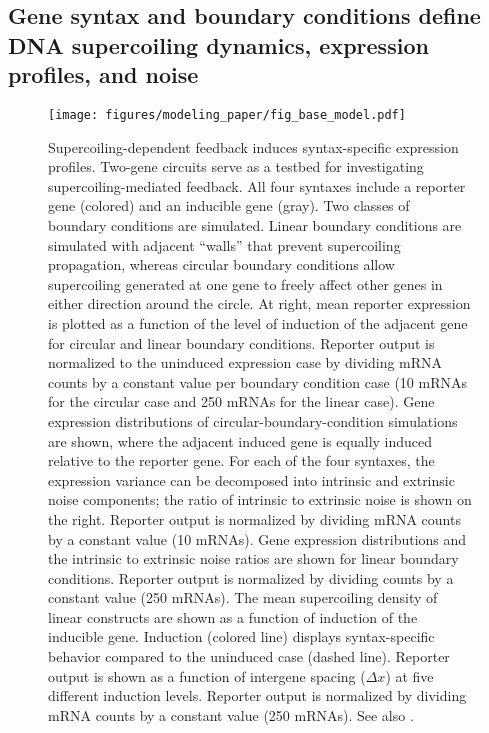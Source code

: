 \documentclass[11pt]{article} %
\begin{document}
\subsection{Gene syntax and boundary conditions define DNA supercoiling dynamics, expression profiles, and noise}
\begin{figure}[ht]
    \centering
    {\texttt{[image: figures/modeling\_paper/fig\_base\_model.pdf]}
    \label{fig:base_orientations}
    \label{fig:bc_induction_sweep}
    \label{fig:circular_bc_distributions}
    \label{fig:linear_bc_distributions}
    \label{fig:base_model_sc_density}
    \label{fig:reporter_output_by_spacing_fold_induction}}
\end{figure}
\begin{figure}
    \ContinuedFloat
    \caption{Supercoiling-dependent feedback induces syntax-specific expression profiles.
         Two-gene circuits serve as a testbed for investigating supercoiling-mediated feedback. All four syntaxes include a reporter gene (colored) and an inducible gene (gray).
         Two classes of boundary conditions are simulated. Linear boundary conditions are simulated with adjacent ``walls'' that prevent supercoiling propagation, whereas circular boundary conditions allow supercoiling generated at one gene to freely affect other genes in either direction around the circle. At right, mean reporter expression is plotted as a function of the level of induction of the adjacent gene for circular and linear boundary conditions. Reporter output is normalized to the uninduced expression case by dividing mRNA counts by a constant value per boundary condition case (10 mRNAs for the circular case and 250 mRNAs for the linear case).
         Gene expression distributions of circular-boundary-condition simulations are shown, where the adjacent induced gene is equally induced relative to the reporter gene. For each of the four syntaxes, the expression variance can be decomposed into intrinsic and extrinsic noise components; the ratio of intrinsic to extrinsic noise is shown on the right. Reporter output is normalized by dividing mRNA counts by a constant value (10 mRNAs).
         Gene expression distributions and the intrinsic to extrinsic noise ratios are shown for linear boundary conditions. Reporter output is normalized by dividing counts by a constant value (250 mRNAs).
         The mean supercoiling density of linear constructs are shown as a function of induction of the inducible gene. Induction (colored line) displays syntax-specific behavior compared to the uninduced case (dashed line).
         Reporter output is shown as a function of intergene spacing (\(\Delta x\)) at five different induction levels. Reporter output is normalized by dividing mRNA counts by a constant value (250 mRNAs). See also .
    } \label{fig:top:orientation_bc_behavior}
\end{figure}
\end{document}

